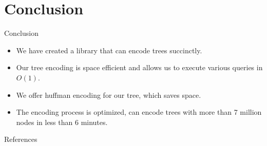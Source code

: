\documentclass{beamer}
\begin{document}
\section*{Conclusion}
\begin{frame}{Conclusion}
	\begin{itemize}
	\item
		We have created a library that can encode trees succinctly.
	\item
		Our tree encoding is space efficient and allows us to execute various queries in $O(1)$.
	\item
		We offer huffman encoding for our tree, which saves space.
	\item
		The encoding process is optimized, can encode trees with more than 7 million nodes in less than 6 minutes.
	\end{itemize}
\end{frame}

\begin{frame}[allowframebreaks]{References}
	
	
\end{frame}
\end{document}
